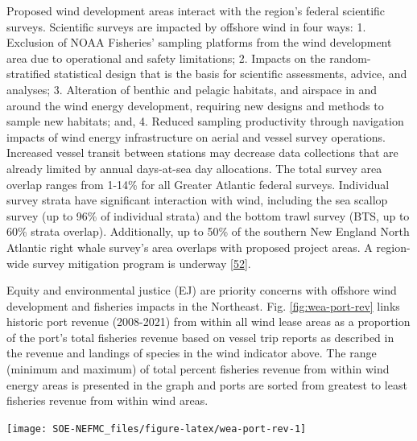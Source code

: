 \documentclass[
  10pt,
]{article}
\let\origfigure\figure
\let\endorigfigure\endfigure
\renewenvironment{figure}[1][2] {
    \expandafter\origfigure\expandafter[H]
} {
    \endorigfigure
}
\begin{document}
Proposed wind development areas interact with the region's federal scientific surveys. Scientific surveys are impacted by offshore wind in four ways: 1. Exclusion of NOAA Fisheries' sampling platforms from the wind development area due to operational and safety limitations; 2. Impacts on the random-stratified statistical design that is the basis for scientific assessments, advice, and analyses; 3. Alteration of benthic and pelagic habitats, and airspace in and around the wind energy development, requiring new designs and methods to sample new habitats; and, 4. Reduced sampling productivity through navigation impacts of wind energy infrastructure on aerial and vessel survey operations. Increased vessel transit between stations may decrease data collections that are already limited by annual days-at-sea day allocations. The total survey area overlap ranges from 1-14\% for all Greater Atlantic federal surveys. Individual survey strata have significant interaction with wind, including the sea scallop survey (up to 96\% of individual strata) and the bottom trawl survey (BTS, up to 60\% strata overlap). Additionally, up to 50\% of the southern New England North Atlantic right whale survey's area overlaps with proposed project areas. A region-wide survey mitigation program is underway {[}\protect\hyperlink{ref-northeast_fisheries_science_center_us_noaa_2022}{52}{]}.

Equity and environmental justice (EJ) are priority concerns with offshore wind development and fisheries impacts in the Northeast. Fig. \ref{fig:wea-port-rev} links historic port revenue (2008-2021) from within all wind lease areas as a proportion of the port's total fisheries revenue based on vessel trip reports as described in the revenue and landings of species in the wind indicator above. The range (minimum and maximum) of total percent fisheries revenue from within wind energy areas is presented in the graph and ports are sorted from greatest to least fisheries revenue from within wind areas.

\begin{figure}

\texttt{[image: SOE-NEFMC\_files/figure-latex/wea-port-rev-1]} \hfill{}

\caption{Percent of port fisheries revenue from Wind Energy Areas (WEA) in descending order from most to least port fisheries revenue from WEA. EJ = Environmental Justice.}\label{fig:wea-port-rev}
\end{figure}
\end{document}
